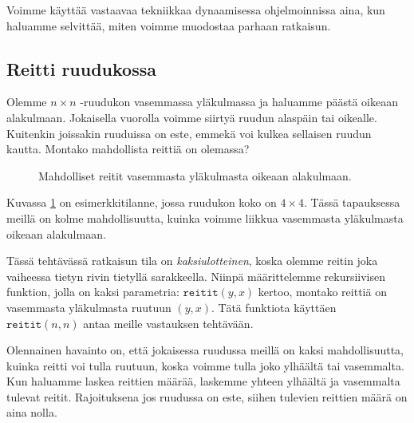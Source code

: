 Voimme käyttää vastaavaa tekniikkaa
dynaamisessa ohjelmoinnissa aina, kun haluamme
selvittää, miten voimme muodostaa parhaan ratkaisun.

\subsection{Reitti ruudukossa}

Olemme $n \times n$ -ruudukon vasemmassa yläkulmassa ja haluamme
päästä oikeaan alakulmaan.
Jokaisella vuorolla voimme siirtyä ruudun alaspäin tai oikealle.
Kuitenkin joissakin ruuduissa on este, emmekä voi kulkea sellaisen
ruudun kautta.
Montako mahdollista reittiä on olemassa?

\begin{figure}
\center
{}
\caption{Mahdolliset reitit vasemmasta yläkulmasta oikeaan alakulmaan.}
\label{fig:reiruu}
\end{figure}

Kuvassa \ref{fig:reiruu} on esimerkkitilanne, jossa ruudukon koko on $4 \times 4$.
Tässä tapauksessa meillä on kolme mahdollisuutta, kuinka voimme liikkua
vasemmasta yläkulmasta oikeaan alakulmaan.

Tässä tehtävässä ratkaisun tila on \emph{kaksiulotteinen},
koska olemme reitin joka vaiheessa tietyn rivin tietyllä sarakkeella.
Niinpä määritte\-lemme rekursiivisen funktion, jolla on kaksi
parametria: $\texttt{reitit}(y,x)$ kertoo, montako reittiä on
vasemmasta yläkulmasta ruutuun $(y,x)$.
Tätä funktiota käyttäen $\texttt{reitit}(n,n)$ antaa meille
vastauksen tehtävään.

Olennainen havainto on, että jokaisessa ruudussa meillä on kaksi
mahdollisuutta, kuinka reitti voi tulla ruutuun,
koska voimme tulla joko ylhäältä tai vasemmalta.
Kun haluamme laskea reittien määrää, laskemme yhteen ylhäältä
ja vasemmalta tulevat reitit.
Rajoituksena jos ruudussa on este, siihen tulevien reittien
määrä on aina nolla.

